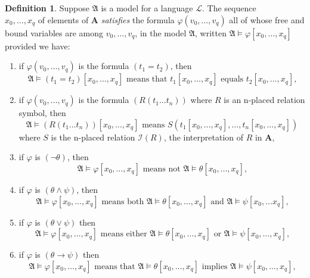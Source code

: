 \documentclass[titlepage, oneside]{amsbook}
\theoremstyle{plain}
\theoremstyle{definition}
\newtheorem{definition}{Definition}
\theoremstyle{remark}
\newcommand{\ba}{\ensuremath{\mathbf{A}}}
\begin{document}
\begin{definition}
% 
Suppose $\mathfrak{A}$ is a model for a language 
$\mathcal{L}$. The sequence \\
 $x_{0}, \dots ,x_{q}$ of elements of $\ba$ \emph{satisfies} the 
formula $\varphi (v_{0} , \dots ,v_{q})$ all of whose free and bound 
variables are among $v_{0}, \dots , v_{q}$, in the model $\mathfrak{A}$, 
written $\mathfrak{A} \models \varphi [x_{0} , \dots ,x_{q}] $ provided 
we have:
\begin{enumerate}
\item if $\varphi(v_{0}, \dots ,v_{q})$ is the  formula 
$(t_{1} = t_{2})$, then 
\[
\mathfrak{A} \models (t_{1} = t_{2})[x_{0}, \dots , x_{q}] \mbox{ 
means that } t_{1}[x_{0}, \dots ,x_{q}] \mbox{ equals } t_{2}[x_{0},
\dots ,x_{q}] \mbox{,}
\]

\item if $\varphi (v_{0}, \dots ,v_{q})$ is the  formula 
$(R(t_{1} \dots t_{n}))$ where $R$ is an n-placed relation symbol, then 
\[ \mathfrak{A} \models (R(t_{1} \dots  t_{n}))[x_{0} , \dots , x_{q}] 
\mbox{ means } 
S(t_{1}[x_{0}, \dots ,x_{q}], \dots , t_{n}[x_{0}, \dots ,x_{q}]) \]
where $S$ is the n-placed relation $\mathcal{I}(R)$,  the
interpretation of $R$ in $\mathbf{A}$,

\item if $\varphi$ is $( \neg \theta ) $, then 
\[
\mathfrak{A} \models \varphi [x_{0}, \dots ,x_{q}]
 \mbox{ means not } \mathfrak{A} \models \theta[x_{0}, \dots ,x_{q}]
\mbox{,}
\]

\item if $\varphi$ is $( \theta \wedge \psi)$, then 
\[
 \mathfrak{A} \models \varphi [x_{0}, \dots ,x_{q} ] \mbox{ means both } 
\mathfrak{A} \models \theta [x_{0} , \dots , x_{q}] \mbox{ and }
\mathfrak{A} \models \psi [x_{0}, \dots x_{q}] \mbox{,} \]

\item if $\varphi$ is $(\theta \vee \psi)$ then 
\[
\mathfrak{A} \models \varphi [x_{0} ,\dots ,x_{q}] \mbox{ means either } 
\mathfrak{A} \models \theta [x_{0}, \dots , x_{q}] \mbox{ or } 
\mathfrak{A} \models \psi [x_{0}, \dots , x_{q}] \mbox{,} \]

\item if $\varphi $ is $( \theta  \to \psi) $ then
\[
\mathfrak{A} \models \varphi [x_{0} ,\dots ,x_{q}] \mbox{ means  that } 
\mathfrak{A} \models \theta [x_{0}, \dots , x_{q}] \mbox{ implies } 
\mathfrak{A} \models \psi [x_{0}, \dots , x_{q}] \mbox{,} \]





\end{enumerate}
\end{definition}
\end{document}
